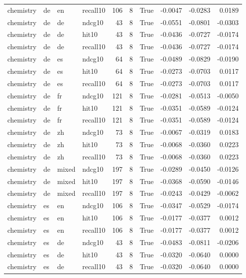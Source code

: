 \begin{tabular}{llllrrrrrr}
chemistry & de & en & recall10 & 106 & 8 & True & -0.0047 & -0.0283 & 0.0189 \\
chemistry & de & de & ndcg10 & 43 & 8 & True & -0.0551 & -0.0801 & -0.0303 \\
chemistry & de & de & hit10 & 43 & 8 & True & -0.0436 & -0.0727 & -0.0174 \\
chemistry & de & de & recall10 & 43 & 8 & True & -0.0436 & -0.0727 & -0.0174 \\
chemistry & de & es & ndcg10 & 64 & 8 & True & -0.0489 & -0.0829 & -0.0190 \\
chemistry & de & es & hit10 & 64 & 8 & True & -0.0273 & -0.0703 & 0.0117 \\
chemistry & de & es & recall10 & 64 & 8 & True & -0.0273 & -0.0703 & 0.0117 \\
chemistry & de & fr & ndcg10 & 121 & 8 & True & -0.0281 & -0.0513 & -0.0050 \\
chemistry & de & fr & hit10 & 121 & 8 & True & -0.0351 & -0.0589 & -0.0124 \\
chemistry & de & fr & recall10 & 121 & 8 & True & -0.0351 & -0.0589 & -0.0124 \\
chemistry & de & zh & ndcg10 & 73 & 8 & True & -0.0067 & -0.0319 & 0.0183 \\
chemistry & de & zh & hit10 & 73 & 8 & True & -0.0068 & -0.0360 & 0.0223 \\
chemistry & de & zh & recall10 & 73 & 8 & True & -0.0068 & -0.0360 & 0.0223 \\
chemistry & de & mixed & ndcg10 & 197 & 8 & True & -0.0289 & -0.0450 & -0.0126 \\
chemistry & de & mixed & hit10 & 197 & 8 & True & -0.0368 & -0.0590 & -0.0146 \\
chemistry & de & mixed & recall10 & 197 & 8 & True & -0.0243 & -0.0429 & -0.0062 \\
chemistry & es & en & ndcg10 & 106 & 8 & True & -0.0347 & -0.0529 & -0.0174 \\
chemistry & es & en & hit10 & 106 & 8 & True & -0.0177 & -0.0377 & 0.0012 \\
chemistry & es & en & recall10 & 106 & 8 & True & -0.0177 & -0.0377 & 0.0012 \\
chemistry & es & de & ndcg10 & 43 & 8 & True & -0.0483 & -0.0811 & -0.0206 \\
chemistry & es & de & hit10 & 43 & 8 & True & -0.0320 & -0.0640 & 0.0000 \\
chemistry & es & de & recall10 & 43 & 8 & True & -0.0320 & -0.0640 & 0.0000 \\

\end{tabular}
